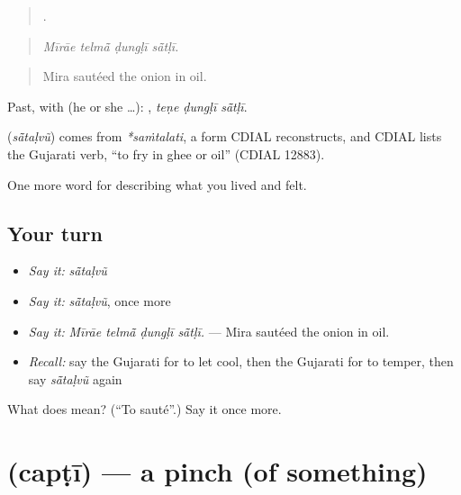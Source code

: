 \begin{quote}
   .
\end{quote}

\begin{quote}
\emph{Mīrāe telmā̃ ḍungḷī sā̃tḷī.}
\end{quote}

\begin{quote}
Mira sautéed the onion in oil.
\end{quote}

Past, with  (he or she …):   , \emph{teṇe ḍungḷī sā̃tḷī}.

\begin{cousinweb}
\textbf{} (\emph{sā̃taḷvũ}) comes from \emph{*saṁtalati}, a form CDIAL reconstructs, and CDIAL lists the Gujarati verb, \textquotedblleft{}to fry in ghee or oil\textquotedblright{} (CDIAL 12883).
\end{cousinweb}

\begin{grammarlens}[title={What you've built}]
One more word for describing what you lived and felt.
\end{grammarlens}

\subsection*{Your turn}
\begin{itemize}
\raggedright
  \item \emph{Say it:} \emph{sā̃taḷvũ}
  \item \emph{Say it:} \emph{sā̃taḷvũ}, once more
  \item \emph{Say it:} \emph{Mīrāe telmā̃ ḍungḷī sā̃tḷī.} — Mira sautéed the onion in oil.
  \item \emph{Recall:} say the Gujarati for to let cool, then the Gujarati for to temper, then say \emph{sā̃taḷvũ} again
\end{itemize}

\begin{tcolorbox}[breakable,colback=teal!4,colframe=teal!35!black,title={Before you move on}]
What does  mean? (\textquotedblleft{}To sauté\textquotedblright{}.) Say it once more.
\end{tcolorbox}
\section[\texorpdfstring{\gu{ચપટી} (capṭī)}{ચપટી (capṭī)}]{ (capṭī) — a pinch (of something)}

